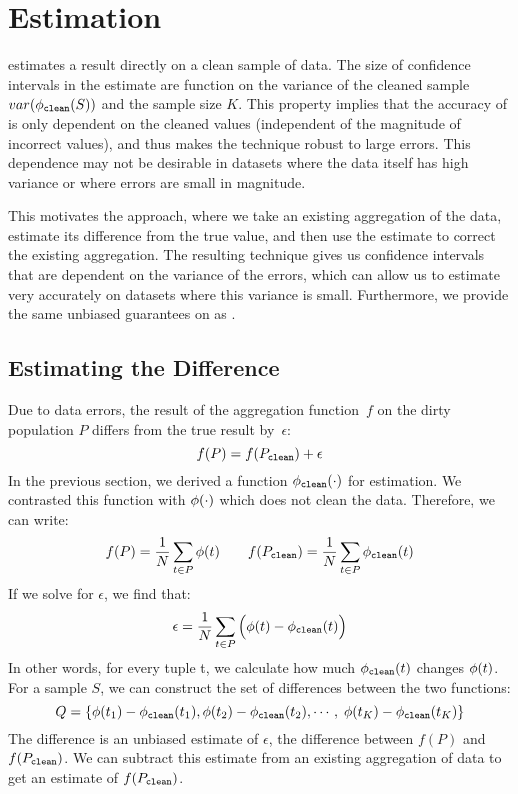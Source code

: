 \section{\bias Estimation}\label{sec:biascorrected}
\sampleclean estimates a result directly on a clean sample of data.
The size of confidence intervals in the \sampleclean estimate are function on the variance of
the cleaned sample $var(\phi_{\texttt{clean} } (S))$ and the sample size $K$.
This property implies that the accuracy of \sampleclean is only dependent on the cleaned values (independent of the magnitude of incorrect values), and thus makes the technique robust to large errors.
This dependence may not be desirable in datasets where the data itself has high variance or where errors are small in magnitude.

This motivates the \bias approach, where we take an existing aggregation of the data, estimate its difference from the true value, and
then use the estimate to correct the existing aggregation.
The resulting technique gives us confidence intervals that are dependent on the variance of the errors, which can allow us to estimate very accurately on datasets
where this variance is small.
Furthermore, we provide the same unbiased guarantees on \bias as \sampleclean.

\subsection{Estimating the Difference}
Due to data errors, the result of the aggregation function~$f$ on the dirty population $P$ differs from the true result by~$\epsilon$:
\[f(P) = f(P_{\texttt{clean} }) + \epsilon\]
In the previous section, we derived a function $\phi_{\texttt{clean} } (\cdot)$ for \sampleclean estimation.
We contrasted this function with $\phi  ( \cdot )$ which does not clean the data.
Therefore, we can write:
\begin{equation}
f(P) = \frac{1}{N}\sum_{t\in P}\phi (t)\hspace{2em}
f(P_{\texttt{clean} }) = \frac{1}{N}\sum_{t\in P}\phi_{\texttt{clean} } (t)
\end{equation}
If we solve for $\epsilon$, we find that:
\begin{equation}
\epsilon = \frac{1}{N}\sum_{t\in P}\Big(\phi (t)-\phi_{\texttt{clean} } (t)\Big)
\end{equation}
In other words, for every tuple t, we calculate how much $\phi_{\texttt{clean} } (t)$ changes $\phi (t)$.
For a sample $S$, we can construct the set of differences between the two functions:
\[\scriptsize
Q=\{\saqpfunc(t_1)-\saqpplusfunc(t_1),\saqpfunc(t_2)-\saqpplusfunc(t_2), \cdots ,\ \saqpfunc(t_K)-\saqpplusfunc(t_K)\}\]
The \mean difference is an unbiased estimate of $\epsilon$, the difference between $f(P)$ and $f(P_{\texttt{clean} })$.
We can subtract this estimate from an existing aggregation of data to get an estimate of $f(P_{\texttt{clean} })$.


